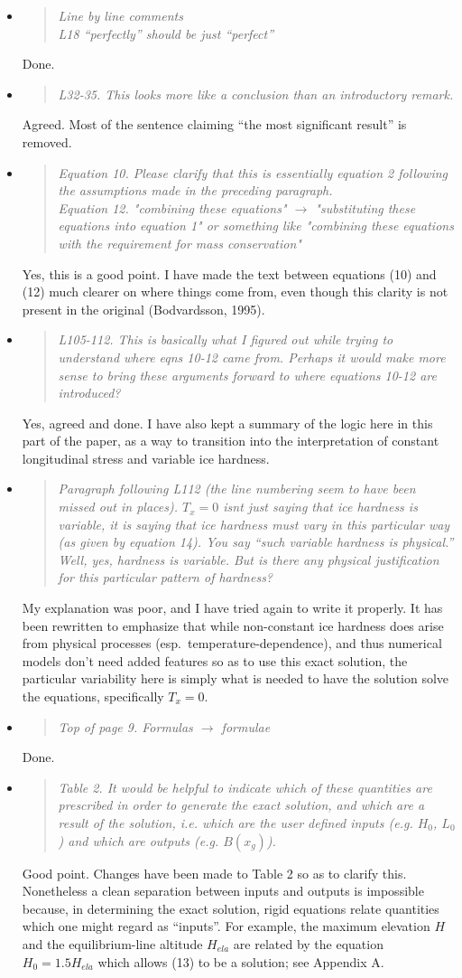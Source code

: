 \documentclass[11pt,reqno]{amsart}
\newcommand{\reply}[2]{
\medskip\medskip
\item  \begin{quote}
\emph{#1}
\end{quote}

\medskip
\noindent #2}
\begin{document}
\begin{itemize}
\reply{Line by line comments \smallskip \\
L18 ``perfectly'' should be just ``perfect''}
{Done.}

\reply{L32-35. This looks more like a conclusion than an introductory remark.}
{Agreed.  Most of the sentence claiming ``the most significant result'' is removed.}

\reply{Equation 10. Please clarify that this is essentially equation 2 following the assumptions made in the preceding paragraph. \smallskip \\
Equation 12. "combining these equations" $\to$ "substituting these equations into equation 1" or something like "combining these equations with the requirement for mass conservation"}
{Yes, this is a good point.  I have made the text between equations (10) and (12) much clearer on where things come from, even though this clarity is not present in the original (Bodvardsson, 1995).}

\reply{L105-112. This is basically what I figured out while trying to understand where eqns 10-12 came from. Perhaps it would make more sense to bring these arguments forward to where equations 10-12 are introduced?}
{Yes, agreed and done.  I have also kept a summary of the logic here in this part of the paper, as a way to transition into the interpretation of constant longitudinal stress and variable ice hardness.}

\reply{Paragraph following L112 (the line numbering seem to have been missed out in places). $T_x=0$ isnt just saying that ice hardness is variable, it is saying that ice hardness must vary in this particular way (as given by equation 14).  You say ``such variable hardness is physical.''  Well, yes, hardness is variable. But is there any physical justification for this particular pattern of hardness?}
{My explanation was poor, and I have tried again to write it properly.  It has been rewritten to emphasize that while non-constant ice hardness does arise from physical processes (esp.~temperature-dependence), and thus numerical models don't need added features so as to use this exact solution, the particular variability here is simply what is needed to have the solution solve the equations, specifically $T_x=0$.}

\reply{Top of page 9. Formulas $\to$ formulae}
{Done.}

\reply{Table 2. It would be helpful to indicate which of these quantities are prescribed in order to generate the exact solution, and which are a result of the solution, i.e. which are the user defined inputs (e.g. $H_0$, $L_0$) and which are outputs (e.g. $B(x_g)$).}
{Good point.  Changes have been made to Table 2 so as to clarify this.  Nonetheless a clean separation between inputs and outputs is impossible because, in determining the exact solution, rigid equations relate quantities which one might regard as ``inputs''.  For example, the maximum elevation $H$ and the equilibrium-line altitude $H_{ela}$ are related by the equation $H_0 = 1.5 H_{ela}$ which allows (13) to be a solution; see Appendix A.}


\end{itemize}
\end{document}
